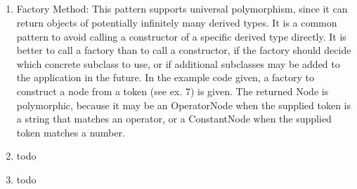 \subsection{}

\begin{enumerate}
\item Factory Method: This pattern supports universal polymorphism, since it can return objects of potentially infinitely many derived types. It is a common pattern to avoid calling a constructor of a specific derived type directly. It is better to call a factory than to call a constructor, if the factory should decide which concrete subclass to use, or if additional subclasses may be added to the application in the future. In the example code given, a factory to construct a node from a token (see ex. 7) is given. The returned Node is polymorphic, because it may be an OperatorNode when the supplied token is a string that matches an operator, or a ConstantNode when the supplied token matches a number.
\item todo
\item todo
\end{enumerate}